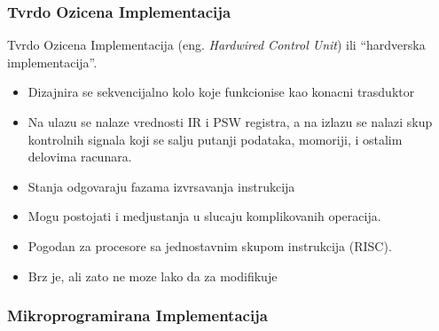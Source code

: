 \documentclass[12p,a4paper]{article}
\begin{document}
\begin{multicols}{2}
    \subsubsection{Tvrdo Ozicena Implementacija}

    Tvrdo Ozicena Implementacija (eng. \emph{Hardwired Control Unit}) ili
    ``hardverska implementacija''.
    \begin{itemize}
        \itemsep0em
        \item Dizajnira se sekvencijalno kolo koje funkcionise kao 
            konacni trasduktor
        \item Na ulazu se nalaze vrednosti IR i PSW registra, a na izlazu
            se nalazi skup kontrolnih signala koji se salju putanji podataka,
            momoriji, i ostalim delovima racunara.
        \item Stanja odgovaraju fazama izvrsavanja instrukcija
        \item Mogu postojati i medjustanja u slucaju komplikovanih operacija.
        \item Pogodan za procesore sa jednostavnim skupom instrukcija (RISC).
        \item Brz je, ali zato ne moze lako da za modifikuje
    \end{itemize}

    \subsubsection{Mikroprogramirana Implementacija}


\end{multicols}
\end{document}
